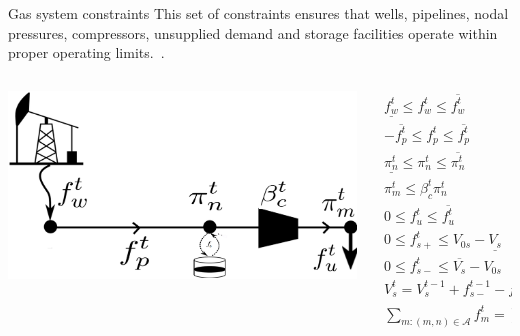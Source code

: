 \documentclass[hyperref={colorlinks,citecolor=blue,linkcolor=blue,urlcolor=blue}]{beamer}
\begin{document}
\begin{frame}{Gas system constraints}
\footnotesize
This set of constraints ensures that wells, pipelines, nodal pressures, compressors, unsupplied demand and storage facilities operate within proper operating limits.~\cite{MPNG}.

\begin{columns}
\begin{column}{0.24\textwidth}
    \includegraphics[width=1.5\textwidth]{figures/gas_dummy.png}
\end{column}
\begin{column}{0.8\textwidth}
\scriptsize  %

\begin{subequations}
\begin{align}
    \underline{f_{w}^t} \leq f_{w}^t \leq \overline{f_{w}^t} &\quad \forall \ w \in \mathcal{W} \label{eq:well_limits} \\
    -\overline{f_{p}^t} \leq f_{p}^t \leq \overline{f_{p}^t} &\quad \forall \ p \in \mathcal{P} \label{eq:pipe_limits} \\
    \underline{\pi_{n}^t} \leq \pi_{n}^t \leq \overline{\pi_{n}^t} &\quad \forall \ n \in \mathcal{N}_f \label{eq:press_limit} \\
    \pi_{m}^t \leq \beta_{c}^t{\pi_{n}^t} &\quad \forall \ c=(n,m) \in \mathcal{C} \label{eq:comp_ratio} \\
    0 \leq f_{u}^{t} \leq \overline{f_{u}^{t}} &\quad \forall \ u \in \mathcal{U} \label{eq:dem_limit_gas} \\
    0 \leq f_{s+}^t \leq V_{0s} - \underline{V_s} &\quad \forall \ s \in \mathcal{S} \label{eq:sto_limit1} \\
    0 \leq f_{s-}^t \leq \overline{V_s} - V_{0s} &\quad \forall \ s \in \mathcal{S} \label{eq:sto_limit2} \\
    V_{s}^t = V_{s}^{t-1} + f_{s-}^{t-1} - f_{s+}^{t-1} &\quad \forall \ s \in \mathcal{S} \label{eq:sto_time} \\ 
    \sum_{m:(m,n)\in\mathcal{A}}{f_{m}^t} = \sum_{m':(n,m')\in\mathcal{A}}{f_{m'}^t} &\quad \forall \ n \in \mathcal{N}_f \label{eq:gas_balance}
\end{align}
\end{subequations}


\end{column}
\end{columns}
\end{frame}
\end{document}
